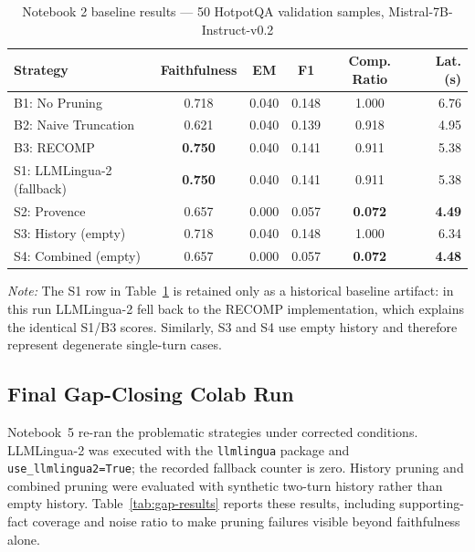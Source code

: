 \documentclass[11pt,a4paper]{article}
\begin{document}
\begin{table}[H]
\centering
\caption{Notebook 2 baseline results --- 50 HotpotQA validation samples, Mistral-7B-Instruct-v0.2}
\label{tab:baseline-results}
\begin{tabular}{lccccr}
\toprule
\textbf{Strategy} & \textbf{Faithfulness} & \textbf{EM} & \textbf{F1} & \textbf{Comp. Ratio} & \textbf{Lat. (s)} \\
\midrule
B1: No Pruning       & 0.718 & 0.040 & 0.148 & 1.000 & 6.76 \\
B2: Naive Truncation & 0.621 & 0.040 & 0.139 & 0.918 & 4.95 \\
B3: RECOMP           & \textbf{0.750} & 0.040 & 0.141 & 0.911 & 5.38 \\
S1: LLMLingua-2 (fallback) & \textbf{0.750} & 0.040 & 0.141 & 0.911 & 5.38 \\
S2: Provence         & 0.657 & 0.000 & 0.057 & \textbf{0.072} & \textbf{4.49} \\
S3: History (empty) & 0.718 & 0.040 & 0.148 & 1.000 & 6.34 \\
S4: Combined (empty) & 0.657 & 0.000 & 0.057 & \textbf{0.072} & \textbf{4.48} \\
\bottomrule
\end{tabular}
\end{table}

\noindent\textit{Note:} The S1 row in Table~\ref{tab:baseline-results} is retained only as a historical baseline artifact: in this run LLMLingua-2 fell back to the RECOMP implementation, which explains the identical S1/B3 scores. Similarly, S3 and S4 use empty history and therefore represent degenerate single-turn cases.

\subsection{Final Gap-Closing Colab Run}

Notebook~5 re-ran the problematic strategies under corrected conditions. LLMLingua-2 was executed with the \texttt{llmlingua} package and \texttt{use\_llmlingua2=True}; the recorded fallback counter is zero. History pruning and combined pruning were evaluated with synthetic two-turn history rather than empty history. Table~\ref{tab:gap-results} reports these results, including supporting-fact coverage and noise ratio to make pruning failures visible beyond faithfulness alone.
\end{document}
